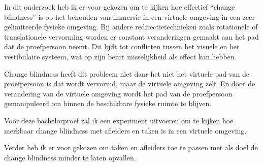 In dit onderzoek heb ik er voor gekozen om te kijken hoe effectief ``change
blindness'' is op het behouden van immersie in een virtuele omgeving in een
zeer gelimiteerde fysieke omgeving. Bij andere redirectietechnieken zoals
rotationele of translationele vervorming worden er constant veranderingen
gemaakt aan het pad dat de proefpersoon neemt. Dit lijdt tot conflicten tussen
het visuele en het vestibulaire systeem, wat op zijn beurt misselijkheid als
effect kan hebben.

Change blindness heeft dit probleem niet daar het niet het virtuele pad van de
proefpersoon is dat wordt vervormd, maar de virtuele omgeving zelf. En door de
verandering van de virtuele omgeving wordt het pad van de proefpersoon 
gemanipuleerd om binnen de beschikbare fysieke ruimte te blijven.

Voor deze bachelorproef zal ik een experiment uitvoeren om te kijken hoe 
merkbaar change blindness met afleiders en taken is in een virtuele omgeving.

Verder heb ik er voor gekozen om taken en afleiders toe te passen met als doel
de change blindness minder te laten opvallen.